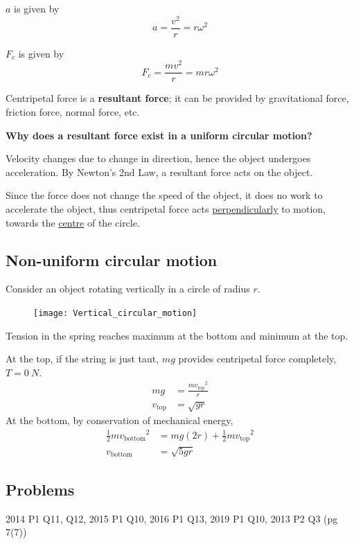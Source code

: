  $a$ is given by
\begin{equation} a = \frac{v^2}{r} = r\omega^2 \end{equation}

 $F_c$ is given by
\begin{equation} F_c = \frac{mv^2}{r} = mr\omega^2 \end{equation}
\begin{remark}
Centripetal force is a \textbf{resultant force}; it can be provided by gravitational force, friction force, normal force, etc. 
\end{remark}

\begin{tcolorbox}
\textbf{Why does a resultant force exist in a uniform circular motion?}

Velocity changes due to change in direction, hence the object undergoes acceleration. By Newton's 2nd Law, a resultant force acts on the object. 

Since the force does not change the speed of the object, it does no work to accelerate the object, thus centripetal force acts \underline{perpendicularly} to motion, towards the \underline{centre} of the circle.
\end{tcolorbox}

\subsection{Non-uniform circular motion}
Consider an object rotating vertically in a circle of radius $r$.
\begin{figure}[H]
	\centering
	\texttt{[image: Vertical\_circular\_motion]}
\end{figure}

Tension in the spring reaches maximum at the bottom and minimum at the top.

At the top, if the string is just taut, $mg$ provides centripetal force completely, $T=0\:\unit{N}$.
\begin{align*}
mg &= \frac{m{v_{\text{top}}}^2}{r}\\
v_{\text{top}} &= \sqrt{gr}
\end{align*}
At the bottom, by conservation of mechanical energy,
\begin{align*}
\frac{1}{2} m{v_{\text{bottom}}}^2 &= mg(2r) + \frac{1}{2} m{v_{\text{top}}}^2\\
v_{\text{bottom}} &= \sqrt{5gr}
\end{align*}
\pagebreak

\subsection*{Problems}
2014 P1 Q11, Q12, 2015 P1 Q10, 2016 P1 Q13, 2019 P1 Q10, 
2013 P2 Q3 (pg 7(7)) 
\pagebreak